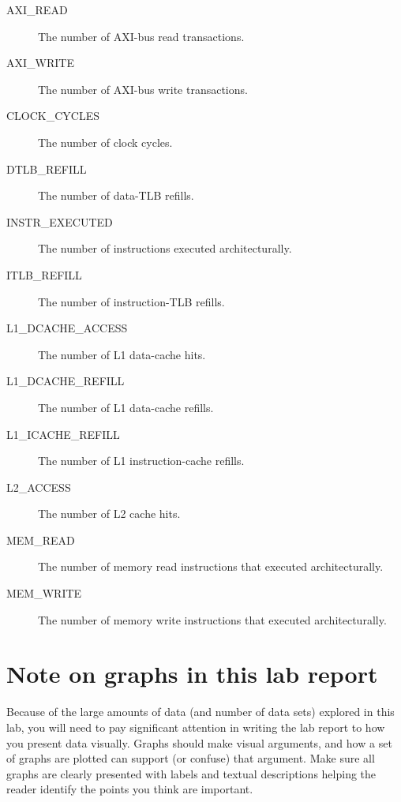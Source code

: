\documentclass[a4paper,10pt]{article}
\begin{document}
\begin{description}

\item[AXI\_READ] The number of AXI-bus read transactions.

\item[AXI\_WRITE] The number of AXI-bus write transactions.

\item[CLOCK\_CYCLES] The number of clock cycles.

\item[DTLB\_REFILL] The number of data-TLB refills.

\item[INSTR\_EXECUTED] The number of instructions executed architecturally.

\item[ITLB\_REFILL] The number of instruction-TLB refills.

\item[L1\_DCACHE\_ACCESS] The number of L1 data-cache hits.

\item[L1\_DCACHE\_REFILL] The number of L1 data-cache refills.

\item[L1\_ICACHE\_REFILL] The number of L1 instruction-cache refills.

\item[L2\_ACCESS] The number of L2 cache hits.

\item[MEM\_READ] The number of memory read instructions that executed
  architecturally.

\item[MEM\_WRITE] The number of memory write instructions that executed
  architecturally.
\end{description}

\section*{Note on graphs in this lab report}

Because of the large amounts of data (and number of data sets) explored in
this lab, you will need to pay significant attention in writing the lab report
to how you present data visually.
Graphs should make visual arguments, and how a set of graphs are plotted can
support (or confuse) that argument.
Make sure all graphs are clearly presented with labels and textual
descriptions helping the reader identify the points you think are important.
\end{document}
